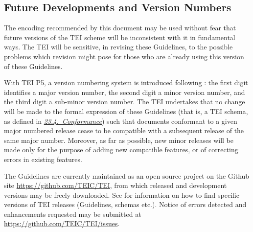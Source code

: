 \subsection[{Future Developments and Version Numbers}]{Future Developments and Version Numbers}\label{ABTEI4}\par
The encoding recommended by this document may be used without fear that future versions of the TEI scheme will be inconsistent with it in fundamental ways. The TEI will be sensitive, in revising these Guidelines, to the possible problems which revision might pose for those who are already using this version of these Guidelines. \par
With TEI P5, a version numbering system is introduced following : the first digit identifies a major version number, the second digit a minor version number, and the third digit a sub-minor version number. The TEI undertakes that no change will be made to the formal expression of these Guidelines (that is, a TEI schema, as defined in \textit{\hyperref[CF]{23.4.\ Conformance}}) such that documents conformant to a given major numbered release cease to be compatible with a subsequent release of the same major number. Moreover, as far as possible, new minor releases will be made only for the purpose of adding new compatible features, or of correcting errors in existing features.\par
The Guidelines are currently maintained as an open source project on the Github site \url{https://github.com/TEIC/TEI}, from which released and development versions may be freely downloaded. See  for information on how to find specific versions of TEI releases (Guidelines, schemas etc.). Notice of errors detected and enhancements requested may be submitted at \url{https://github.com/TEIC/TEI/issues}.